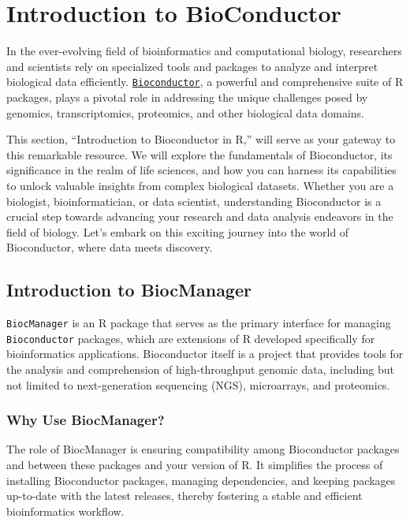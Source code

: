 \documentclass[
]{book}
\begin{document}
\hypertarget{introduction-to-bioconductor}{%
\chapter{Introduction to BioConductor}\label{introduction-to-bioconductor}}

In the ever-evolving field of bioinformatics and computational biology, researchers and scientists rely on specialized tools and packages to analyze and interpret biological data efficiently. \href{https://bioconductor.org/}{\texttt{Bioconductor}}, a powerful and comprehensive suite of R packages, plays a pivotal role in addressing the unique challenges posed by genomics, transcriptomics, proteomics, and other biological data domains.

This section, ``Introduction to Bioconductor in R,'' will serve as your gateway to this remarkable resource. We will explore the fundamentals of Bioconductor, its significance in the realm of life sciences, and how you can harness its capabilities to unlock valuable insights from complex biological datasets. Whether you are a biologist, bioinformatician, or data scientist, understanding Bioconductor is a crucial step towards advancing your research and data analysis endeavors in the field of biology. Let's embark on this exciting journey into the world of Bioconductor, where data meets discovery.

\hypertarget{introduction-to-biocmanager}{%
\section{Introduction to BiocManager}\label{introduction-to-biocmanager}}

\texttt{BiocManager} is an R package that serves as the primary interface for managing \texttt{Bioconductor} packages, which are extensions of R developed specifically for bioinformatics applications. Bioconductor itself is a project that provides tools for the analysis and comprehension of high-throughput genomic data, including but not limited to next-generation sequencing (NGS), microarrays, and proteomics.

\hypertarget{why-use-biocmanager}{%
\subsection{Why Use BiocManager?}\label{why-use-biocmanager}}

The role of BiocManager is ensuring compatibility among Bioconductor packages and between these packages and your version of R. It simplifies the process of installing Bioconductor packages, managing dependencies, and keeping packages up-to-date with the latest releases, thereby fostering a stable and efficient bioinformatics workflow.
\end{document}
